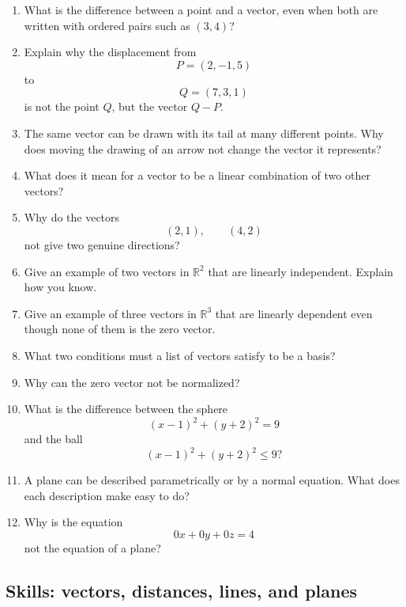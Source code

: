 \begin{enumerate}
    \item What is the difference between a point and a vector, even when both are written
    with ordered pairs such as \((3,4)\)?

    \item Explain why the displacement from
    \[
        P=(2,-1,5)
    \]
    to
    \[
        Q=(7,3,1)
    \]
    is not the point \(Q\), but the vector \(Q-P\).

    \item The same vector can be drawn with its tail at many different points.  Why does
    moving the drawing of an arrow not change the vector it represents?

    \item What does it mean for a vector to be a linear combination of two other vectors?

    \item Why do the vectors
    \[
        (2,1),\qquad (4,2)
    \]
    not give two genuine directions?

    \item Give an example of two vectors in \(\mathbb R^2\) that are linearly independent.
    Explain how you know.

    \item Give an example of three vectors in \(\mathbb R^3\) that are linearly dependent
    even though none of them is the zero vector.

    \item What two conditions must a list of vectors satisfy to be a basis?

    \item Why can the zero vector not be normalized?

    \item What is the difference between the sphere
    \[
        (x-1)^2+(y+2)^2=9
    \]
    and the ball
    \[
        (x-1)^2+(y+2)^2\leq 9?
    \]

    \item A plane can be described parametrically or by a normal equation.  What does
    each description make easy to do?

    \item Why is the equation
    \[
        0x+0y+0z=4
    \]
    not the equation of a plane?
\end{enumerate}

\subsection{Skills: vectors, distances, lines, and planes}

